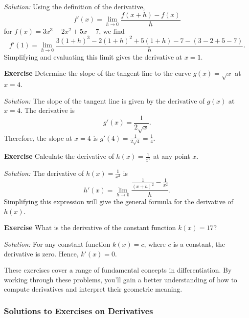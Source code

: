 \documentclass[a4paper,12pt]{book}
\newenvironment{exercise}[1][]
  {\par\medskip\noindent\textbf{Exercise #1} \rmfamily}
  {\medskip}
\newcounter{problem}
\newenvironment{solution}[1][]
{\par\noindent\textit{Solution:} \rmfamily}{\medskip}
\begin{document}
\begin{solution}
Using the definition of the derivative,
\[ f'(x) = \lim_{h \to 0} \frac{f(x+h) - f(x)}{h} \]
for \( f(x) = 3x^3 - 2x^2 + 5x - 7 \), we find
\[ f'(1) = \lim_{h \to 0} \frac{3(1+h)^3 - 2(1+h)^2 + 5(1+h) - 7 - (3 - 2 + 5 - 7)}{h}. \]
Simplifying and evaluating this limit gives the derivative at \( x = 1 \).
\end{solution}

\begin{exercise}
Determine the slope of the tangent line to the curve \( g(x) = \sqrt{x} \) at \( x = 4 \).
\end{exercise}

\begin{solution}
The slope of the tangent line is given by the derivative of \( g(x) \) at \( x = 4 \). The derivative is
\[ g'(x) = \frac{1}{2\sqrt{x}}. \]
Therefore, the slope at \( x = 4 \) is \( g'(4) = \frac{1}{2\sqrt{4}} = \frac{1}{4}. \)
\end{solution}

\begin{exercise}
Calculate the derivative of \( h(x) = \frac{1}{x^2} \) at any point \( x \).
\end{exercise}

\begin{solution}
The derivative of \( h(x) = \frac{1}{x^2} \) is
\[ h'(x) = \lim_{h \to 0} \frac{\frac{1}{(x+h)^2} - \frac{1}{x^2}}{h}. \]
Simplifying this expression will give the general formula for the derivative of \( h(x) \).
\end{solution}

\begin{exercise}
What is the derivative of the constant function \( k(x) = 17 \)?
\end{exercise}

\begin{solution}
For any constant function \( k(x) = c \), where \( c \) is a constant, the derivative is zero. Hence, \( k'(x) = 0 \).
\end{solution}

These exercises cover a range of fundamental concepts in differentiation. By working through these problems, you'll gain a better understanding of how to compute derivatives and interpret their geometric meaning.

\subsubsection*{Solutions to Exercises on Derivatives}
\end{document}
